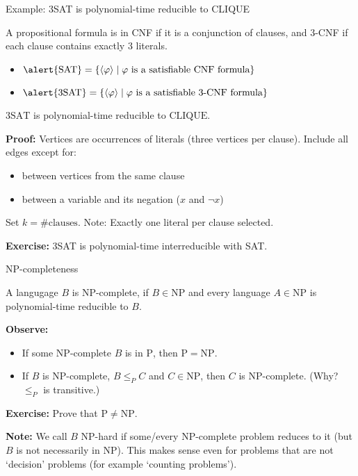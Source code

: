\documentclass[handout]{beamer}
\begin{document}
\begin{frame}{Example: 3SAT is polynomial-time reducible to CLIQUE}
    
    A propositional formula is in \alert{CNF} if it is a conjunction of clauses, and \alert{3-CNF} if each clause contains exactly 3 literals.

    \begin{itemize}
        \item $\alert{\mathrm{SAT}}=\{\langle\varphi\rangle\mid \varphi\text{ is a satisfiable CNF formula}\}$
        \item $\alert{\mathrm{3SAT}}=\{\langle\varphi\rangle\mid \varphi\text{ is a satisfiable 3-CNF formula}\}$
    \end{itemize}
    
    \begin{theorem}
        $\mathrm{3SAT}$ is polynomial-time reducible to $\mathrm{CLIQUE}$.
    \end{theorem}
    \textbf{Proof:} Vertices are occurrences of literals (three vertices per clause). Include all edges except for:
    \begin{itemize}
        \item between vertices from the same clause
        \item between a variable and its negation ($x$ and $\neg x$)
    \end{itemize}
    Set $k=\#\text{clauses}$. Note: Exactly one literal per clause selected.\hfill\qedsymbol

    \textbf{Exercise:} 3SAT is polynomial-time interreducible with SAT.

\end{frame}


\begin{frame}{NP-completeness}

    \begin{definition}
    A langugage $B$ is \alert{$\mathrm{NP}$-complete}, if $B\in\mathrm{NP}$ and every language $A\in \mathrm{NP}$ is polynomial-time reducible to $B$.
    \end{definition}
    
    \textbf{Observe:}
    \begin{itemize}
        \item If some $\mathrm{NP}$-complete $B$ is in $\mathrm{P}$, then $\mathrm{P}=\mathrm{NP}$.
        \item If $B$ is $\mathrm{NP}$-complete, $B\leq_P C$ and $C\in\mathrm{NP}$, then $C$ is $\mathrm{NP}$-complete. (Why? $\leq_P$ is transitive.)
    \end{itemize}

    \textbf{Exercise:} Prove that $\mathrm{P}\neq\mathrm{NP}$.

    \textbf{Note:} We call $B$ \alert{$\mathrm{NP}$-hard} if some/every $\mathrm{NP}$-complete problem reduces to it (but $B$ is not necessarily in $\mathrm{NP}$). This makes sense even for problems that are not `decision' problems (for example `counting problems').    

\end{frame}
  
\end{document}
